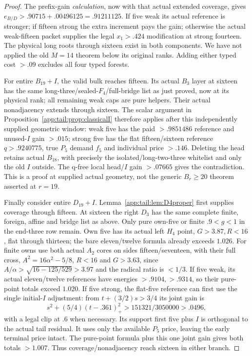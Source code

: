 \documentclass[11pt]{article}
\theoremstyle{definition}
\theoremstyle{remark}
\begin{document}
\begin{proof}
The prefix-gain \emph{calculation}, now with that actual extended
coverage, gives $e_{B/D}>.90715+.00496125=.91211125$.
If five weak its actual reference is stronger; if fifteen strong
the extra increment pays the gain; otherwise the actual weak-fifteen
packet supplies the legal $x_1>.424$ modification at strong fourteen.
The physical long roots through sixteen exist in both components.
We have not applied the old $M=14$ theorem below its original ranks.
Adding either typed cost $>.09$ excludes all four typed forests.

For entire $B_{19}+I$, the valid bulk reaches fifteen. Its actual
$B_3$ layer at sixteen has the same long-three/sealed-$F_4$/full-bridge
list as just proved, now at its physical rank; all remaining weak
caps are pure helpers. Their actual nonadjacency extends through
sixteen. The scalar argument in
Proposition~\ref{app:tail:prop:classicalI} therefore applies after
this independently supplied geometric window: weak five has the
paid $>.9851486$ reference and unused-$I$ gain $>.015$; strong
five has the flat fifteen/sixteen reference $q>.9240775$, true
$P_5$ demand $f_5$ and individual price $>.146$.
Deleting the head retains actual $B_{18}$, with precisely the
isolated/long-two-three whitelist and only the old $I$ outside.
The q-free local head/$I$ gain $>.07665$ gives the contradiction.
This is a proof at supplied actual geometry, not the generic
$B_r\ge20$ theorem asserted at $r=19$.

Finally consider entire $D_{19}+I$. Lemma~\ref{app:tail:lem:D4proper}
first supplies coverage through fifteen. At sixteen the right $D_3$
has the same complete finite, foreign, affine and bridge list as above.
Only pure own-five or finite $.9<g<1$ in the end-three row remain.
Own five has its actual left $H_4$ point, $G>3.87,R<16$, flat
through thirteen; the bare eleven/twelve formula already exceeds
$1.026$. For finite owns use both actual $A_2$ cores on sides
fifteen/seventeen, with their full cross, $A^2=16\alpha^2-5/8$,
$R<16$ and $G>3.63$, since
$A/\alpha>\sqrt{16-125/529}>3.97$ and the radical ratio is $<1/3$.
If five weak, its actual eleven/twelve references have energies
$>.9104,>.9314$, so their pure-point totals exceed $1.020$.
If five strong, the flat-five reference can first use the single
initial-$I$ adjustment: from $t+(3/2)s>3/4$ its joint gain is
\[
 s^2+(5/4)(t-.361)_+^2>151321/3050000>.0496,
\]
with a legal clip at $.6$ when necessary. Its support first five
plus $I$ is orthogonal to the actual tail residual. It uses only
the available $P_5$ price, leaving the early terminal price intact.
The pure-point formula plus this one joint gain gives both totals
$>1.007$. Thus coverage/nonadjacency reach sixteen in either branch.


\end{proof}
\end{document}
